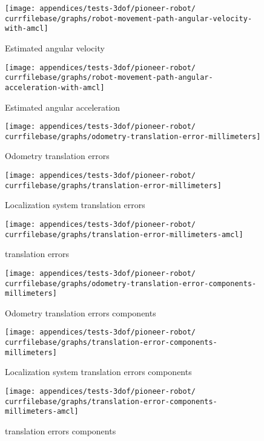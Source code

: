 \begin{figure}[H]
	\centering
	\texttt{[image: appendices/tests-3dof/pioneer-robot/\\currfilebase/graphs/robot-movement-path-angular-velocity-with-amcl]}
	\caption{Estimated angular velocity}
\end{figure}

\begin{figure}[H]
	\centering
	\texttt{[image: appendices/tests-3dof/pioneer-robot/\\currfilebase/graphs/robot-movement-path-angular-acceleration-with-amcl]}
	\caption{Estimated angular acceleration}
\end{figure}


\begin{figure}[H]
	\centering
	\texttt{[image: appendices/tests-3dof/pioneer-robot/\\currfilebase/graphs/odometry-translation-error-millimeters]}
	\caption{Odometry translation errors}
\end{figure}

\begin{figure}[H]
	\centering
	\texttt{[image: appendices/tests-3dof/pioneer-robot/\\currfilebase/graphs/translation-error-millimeters]}
	\caption{Localization system translation errors}
\end{figure}

\begin{figure}[H]
	\centering
	\texttt{[image: appendices/tests-3dof/pioneer-robot/\\currfilebase/graphs/translation-error-millimeters-amcl]}
	\caption{ translation errors}
\end{figure}


\begin{figure}[H]
	\centering
	\texttt{[image: appendices/tests-3dof/pioneer-robot/\\currfilebase/graphs/odometry-translation-error-components-millimeters]}
	\caption{Odometry translation errors components}
\end{figure}

\begin{figure}[H]
	\centering
	\texttt{[image: appendices/tests-3dof/pioneer-robot/\\currfilebase/graphs/translation-error-components-millimeters]}
	\caption{Localization system translation errors components}
\end{figure}

\begin{figure}[H]
	\centering
	\texttt{[image: appendices/tests-3dof/pioneer-robot/\\currfilebase/graphs/translation-error-components-millimeters-amcl]}
	\caption{ translation errors components}
\end{figure}


